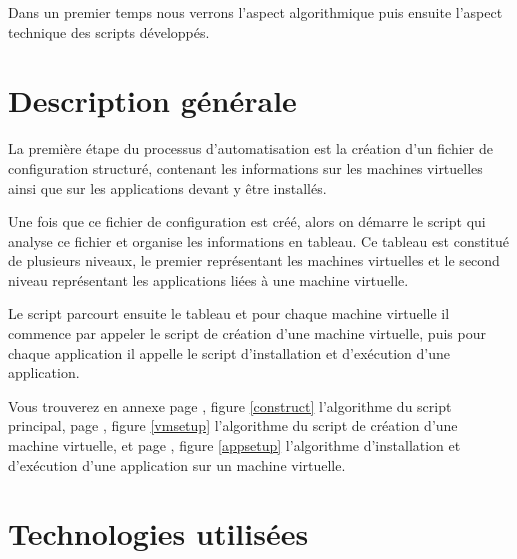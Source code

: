\documentclass{report}
\begin{document}

    Dans un premier temps nous verrons l'aspect algorithmique puis ensuite l'aspect technique des scripts développés.


    \section{Description générale}

    La première étape du processus d'automatisation est la création d'un fichier de configuration structuré, contenant les informations sur les machines virtuelles ainsi que sur les applications devant y être installés.\bigbreak
    
    Une fois que ce fichier de configuration est créé, alors on démarre le script qui analyse ce fichier et organise les informations en tableau. Ce tableau est constitué de plusieurs niveaux, le premier représentant les machines virtuelles et le second niveau représentant les applications liées à une machine virtuelle.\bigbreak
    
    Le script parcourt ensuite le tableau et pour chaque machine virtuelle il commence par appeler le script de création d'une machine virtuelle, puis pour chaque application il appelle le script d'installation et d'exécution d'une application.\bigbreak
    
    Vous trouverez en annexe page \pageref{construct}, figure \ref{construct} l'algorithme du script principal, page \pageref{vmsetup}, figure \ref{vmsetup} l'algorithme du script de création d'une machine virtuelle, et page \pageref{appsetup}, figure \ref{appsetup} l'algorithme d'installation et d'exécution d'une application sur un machine virtuelle. \bigbreak
    
    

    \section{Technologies utilisées}
\end{document}
